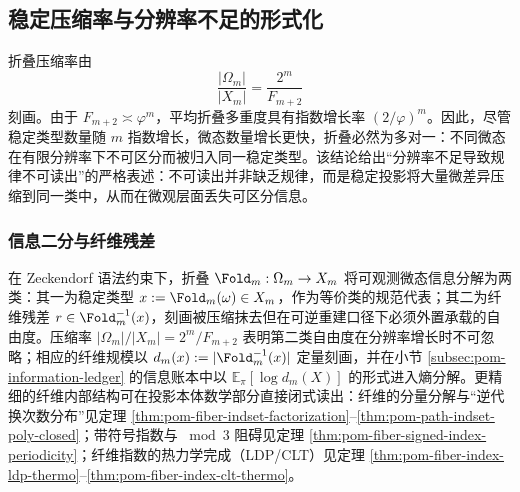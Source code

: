 \subsection{稳定压缩率与分辨率不足的形式化}\label{subsec:folding-stable-compression-resolution}

折叠压缩率由
\[
\frac{|\Omega_m|}{|X_m|}=\frac{2^m}{F_{m+2}}
\]
刻画。由于 $F_{m+2}\asymp \varphi^m$，平均折叠多重度具有指数增长率 $(2/\varphi)^m$。因此，尽管稳定类型数量随 $m$ 指数增长，微态数量增长更快，折叠必然为多对一：不同微态在有限分辨率下不可区分而被归入同一稳定类型。该结论给出“分辨率不足导致规律不可读出”的严格表述：不可读出并非缺乏规律，而是稳定投影将大量微差异压缩到同一类中，从而在微观层面丢失可区分信息。

\subsubsection{信息二分与纤维残差}
在 Zeckendorf 语法约束下，折叠 $\Fold_m:\Omega_m\to X_m$ 将可观测微态信息分解为两类：其一为稳定类型 $x:=\Fold_m(\omega)\in X_m$，作为等价类的规范代表；其二为纤维残差 $r\in \Fold_m^{-1}(x)$，刻画被压缩抹去但在可逆重建口径下必须外置承载的自由度。压缩率 $|\Omega_m|/|X_m|=2^m/F_{m+2}$ 表明第二类自由度在分辨率增长时不可忽略；相应的纤维规模以 $d_m(x):=|\Fold_m^{-1}(x)|$ 定量刻画，并在小节 \ref{subsec:pom-information-ledger} 的信息账本中以 $\mathbb{E}_{\pi}[\log d_m(X)]$ 的形式进入熵分解。更精细的纤维内部结构可在投影本体数学部分直接闭式读出：纤维的分量分解与“逆代换次数分布”见定理 \ref{thm:pom-fiber-indset-factorization}--\ref{thm:pom-path-indset-poly-closed}；带符号指数与 \(\bmod 3\) 阻碍见定理 \ref{thm:pom-fiber-signed-index-periodicity}；纤维指数的热力学完成（LDP/CLT）见定理 \ref{thm:pom-fiber-index-ldp-thermo}--\ref{thm:pom-fiber-index-clt-thermo}。
